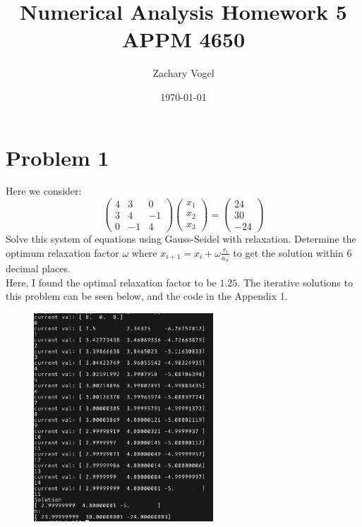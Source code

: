 \documentclass{article}
\author{Zachary Vogel}
\title{Numerical Analysis Homework 5\\ APPM 4650}
\date{\today}
\begin{document}
 



\maketitle


\section*{Problem 1}
Here we consider:
\[\begin{pmatrix}4 & 3 & 0\\3 & 4&-1\\0&-1&4\end{pmatrix}\begin{pmatrix}x_1\\x_2\\x_3\end{pmatrix}=\begin{pmatrix}24\\30\\-24\end{pmatrix}\]
Solve this system of equations using Gauss-Seidel with relaxation. Determine the optimum relaxation factor $\omega$ where $x_{i+1}=x_i+\omega\frac{r_i}{a_{ii}}$ to get the solution within 6 decimal places.\\
Here, I found the optimal relaxation factor to be $1.25$. The iterative solutions to this problem can be seen below, and the code in the Appendix 1.
\begin{figure}[H]
    \centering
    \includegraphics[width=0.6\textwidth]{p1.png}
\end{figure}
\end{document}
